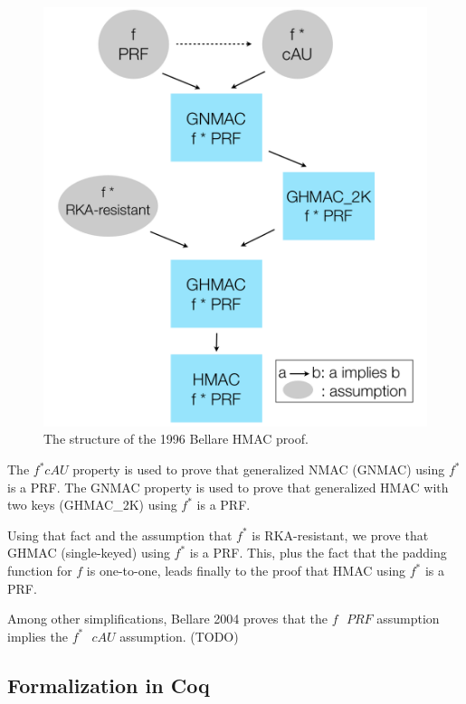 \documentclass[twocolumn,showpacs,%
  nofootinbib,aps,superscriptaddress,%
  eqsecnum,prd,notitlepage,showkeys,10pt]{revtex4-1}
\newcommand{\s} {\textrm{ }}
\begin{document}
\begin{figure}[h!]
	\centering
	\includegraphics[scale=0.4]{HMAC_proof}
	\caption{The structure of the 1996 Bellare HMAC proof.}
\end{figure}

The $f^* cAU$ property is used to prove that generalized NMAC (GNMAC) using $f^*$ is a PRF. The GNMAC property is used to prove that generalized HMAC with two keys (GHMAC\_2K) using $f^*$ is a PRF.

Using that fact and the assumption that $f^*$ is RKA-resistant, we prove that GHMAC (single-keyed) using $f^*$ is a PRF. This, plus the fact that the padding function for $f$ is one-to-one, leads finally to the proof that HMAC using $f^*$ is a PRF.

Among other simplifications, Bellare 2004 proves that the $f \s PRF$ assumption implies the $f^* \s cAU$ assumption. (TODO)


\subsection{Formalization in Coq}
\end{document}
